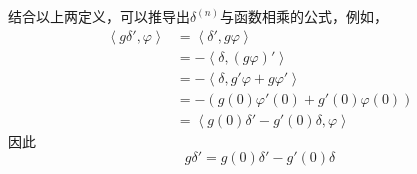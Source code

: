 \documentclass{ctexbook}
\begin{document}
\begin{example}
结合以上两定义，可以推导出$\delta^{(n)}$与函数相乘的公式，例如，
\begin{align*}
    \left\langle g\delta',\varphi\right\rangle & =\left\langle \delta',g\varphi\right\rangle\\
    & =-\left\langle\delta,(g\varphi)'\right\rangle              \\
    & =-\left\langle\delta,g'\varphi+g\varphi'\right\rangle      \\
    & =-(g(0)\varphi'(0)+g'(0)\varphi(0))             \\
    & =\left\langle g(0)\delta'-g'(0)\delta,\varphi\right\rangle
\end{align*}
因此
\[g\delta'=g(0)\delta'-g'(0)\delta\]
\end{example}
\end{document}
